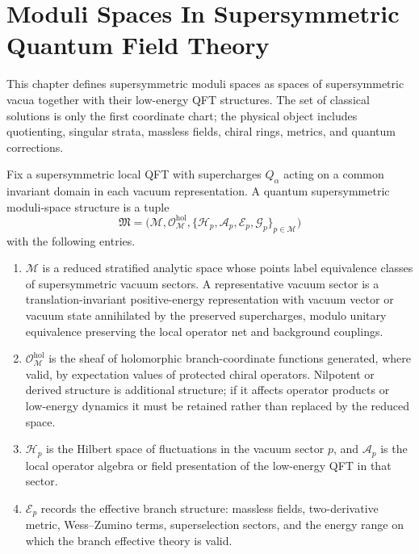 \chapter{Moduli Spaces In Supersymmetric Quantum Field Theory}
\label{ch:susy-moduli-spaces}

\ConventionsMixed

This chapter defines supersymmetric moduli spaces as spaces of supersymmetric
vacua together with their low-energy QFT structures.  The set of classical solutions
is only the first coordinate chart; the physical object includes quotienting,
singular strata, massless fields, chiral rings, metrics, and quantum
corrections.

\begin{definition}
\label{def:quantum-supersymmetric-moduli-space-datum}
Fix a supersymmetric local QFT with supercharges \(Q_\alpha\) acting on a
common invariant domain in each vacuum representation.  A quantum
supersymmetric moduli-space structure is a tuple
\[
  \mathfrak M
  =
  \bigl(
  \mathcal M,\mathcal O_{\mathcal M}^{\mathrm{hol}},
  \{\mathcal H_p,\mathcal A_p,\mathcal E_p,\mathcal G_p\}_{p\in\mathcal M}
  \bigr)
\]
with the following entries.
\begin{enumerate}
\item \(\mathcal M\) is a reduced stratified analytic space whose points
label equivalence classes of supersymmetric vacuum sectors.  A representative
vacuum sector is a translation-invariant positive-energy representation with
vacuum vector or vacuum state annihilated by the preserved supercharges,
modulo unitary equivalence preserving the local operator net and background
couplings.
\item \(\mathcal O_{\mathcal M}^{\mathrm{hol}}\) is the sheaf of holomorphic
branch-coordinate functions generated, where valid, by expectation values of
protected chiral operators.  Nilpotent or derived structure is additional
structure; if
it affects operator products or low-energy dynamics it must be retained
rather than replaced by the reduced space.
\item \(\mathcal H_p\) is the Hilbert space of fluctuations in the vacuum
sector \(p\), and \(\mathcal A_p\) is the local operator algebra or field
presentation of the low-energy QFT in that sector.
\item \(\mathcal E_p\) records the effective branch structure: massless fields,
two-derivative metric, Wess--Zumino terms, superselection sectors, and the
energy range on which the branch effective theory is valid.

\end{enumerate}
\end{definition}
